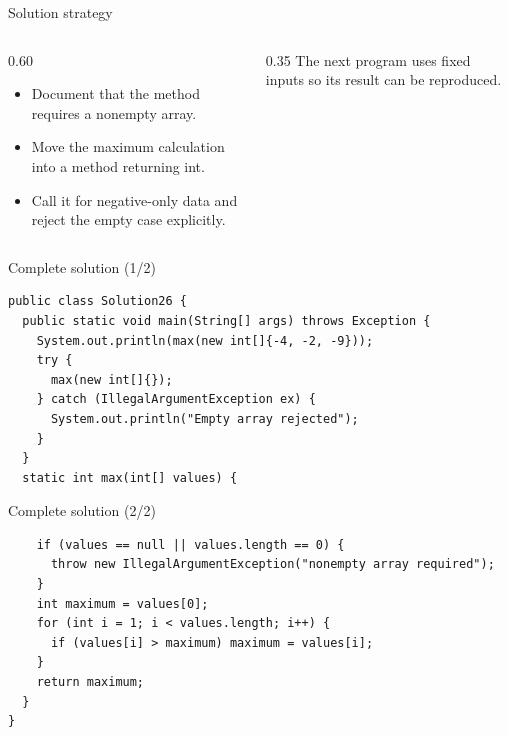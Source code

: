 \documentclass[10pt,aspectratio=169]{beamer}
\begin{document}
\begin{frame}[fragile,t]{Solution strategy}
\begin{columns}[T,onlytextwidth]\begin{column}{0.60\textwidth}
\begin{itemize}
\item Document that the method requires a nonempty array.
\item Move the maximum calculation into a method returning int.
\item Call it for negative-only data and reject the empty case explicitly.
\end{itemize}
\end{column}\begin{column}{0.35\textwidth}\small
The next program uses fixed inputs so its result can be reproduced.
\end{column}\end{columns}
\end{frame}

\begin{frame}[fragile,t]{Complete solution (1/2)}
\begin{lstlisting}
public class Solution26 {
  public static void main(String[] args) throws Exception {
    System.out.println(max(new int[]{-4, -2, -9}));
    try {
      max(new int[]{});
    } catch (IllegalArgumentException ex) {
      System.out.println("Empty array rejected");
    }
  }
  static int max(int[] values) {
\end{lstlisting}
\end{frame}

\begin{frame}[fragile,t]{Complete solution (2/2)}
\begin{lstlisting}
    if (values == null || values.length == 0) {
      throw new IllegalArgumentException("nonempty array required");
    }
    int maximum = values[0];
    for (int i = 1; i < values.length; i++) {
      if (values[i] > maximum) maximum = values[i];
    }
    return maximum;
  }
}
\end{lstlisting}
\end{frame}
\end{document}
